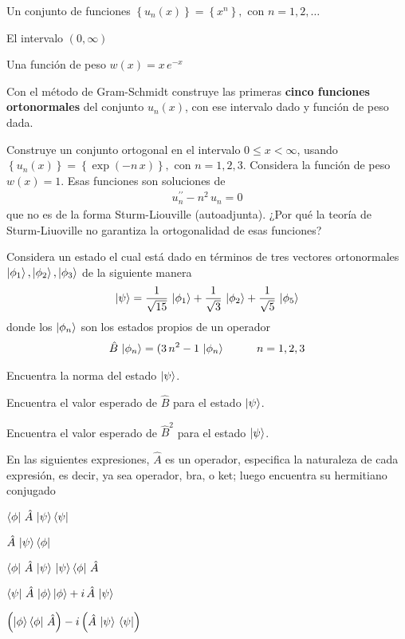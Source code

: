 \begin{milista}
\begin{milista}
\item Un conjunto de funciones $\left\{ u_{n} (x) \right\} = \left\{ x^{n} \right\}, \mbox{ con } n = 1, 2, \ldots$
\item El intervalo $(0, \infty)$
\item Una función de peso $w(x) = x \, e^{-x}$
\end{milista}
Con el método de Gram-Schmidt construye las primeras \textbf{cinco funciones ortonormales} del conjunto $u_{n}(x)$, con ese intervalo dado y función de peso dada.
\item Construye un conjunto ortogonal en el intervalo $0 \leq x < \infty$, usando $\left\{ u_{n}(x) \right\} = \left\{ \exp(-n \, x) \right\}, \mbox{ con } n = 1, 2, 3$. Considera la función de peso $w(x) = 1$. Esas funciones son soluciones de
\begin{align*}
u_{n}^{\prime \prime} - n^{2} \, u_{n} = 0
\end{align*}
que no es de la forma Sturm-Liouville (autoadjunta). ¿Por qué la teoría de Sturm-Liuoville no garantiza la ortogonalidad de esas funciones?
\item Considera un estado el cual está dado en términos de tres vectores ortonormales $\ket{\phi_{1}}, \ket{\phi_{2}}, \ket{\phi_{3}}$ de la siguiente manera
\begin{align*}
\ket{\psi} = \dfrac{1}{\sqrt{15}} \, \ket{\phi_{1}} + \dfrac{1}{\sqrt{3}} \, \ket{\phi_{2}} + \dfrac{1}{\sqrt{5}} \, \ket{\phi_{5}}
\end{align*}
donde los $\ket{\phi_{n}}$ son los estados propios de un operador 
\begin{align*}
\hat{B} \, \ket{\phi_{n}} = (3 \, n^{2} - 1 \, \ket{\phi_{n}} \hspace{1cm} n = 1, 2, 3
\end{align*}
\begin{milista}
\item Encuentra la norma del estado $\ket{\psi}$.
\item Encuentra el valor esperado de $\hat{B}$ para el estado $\ket{\psi}$.
\item Encuentra el valor esperado de $\hat{B}^{2}$ para el estado $\ket{\psi}$.
\end{milista}
\item En las siguientes expresiones, $\hat{A}$ es un operador, especifica la naturaleza de cada expresión, es decir, ya sea operador, bra, o ket; luego encuentra su hermitiano conjugado
\begin{milista}
\item $\bra{\phi} \, \hat{A} \, \ket{\psi} \bra{\psi}$
\item $\hat{A} \, \ket{\psi} \bra{\phi}$
\item $\bra{\phi} \, \hat{A} \, \ket{\psi} \, \ket{\psi} \bra{\phi} \, \hat{A}$
\item $\bra{\psi} \, \hat{A} \, \ket{\phi} \ket{\phi} + i \, \hat{A} \, \ket{\psi}$
\item $\left( \ket{\phi} \bra{\phi} \, \hat{A} \right) - i \left( \hat{A} \, \ket{\psi} \, \bra{\psi} \right)$
\end{milista}
\end{milista}
